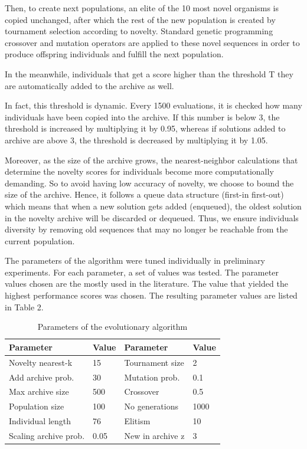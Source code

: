 Then, to create next populations, an elite of the 10 most novel organisms is copied unchanged, after which the rest of the new population is created by tournament selection according to novelty. Standard genetic programming crossover and mutation operators are applied to these novel sequences in order to produce offspring individuals and fulfill the next population.

In the meanwhile, individuals that get a score higher than the threshold T they are automatically added to the archive as well. 

In fact, this threshold is dynamic. Every 1500 evaluations, it is checked how many individuals have been copied into the archive. If this number is below 3, the threshold is increased by multiplying it by 0.95, whereas if solutions added to archive are above 3, the threshold is decreased by multiplying it by 1.05. 

Moreover, as the size of the archive grows, the nearest-neighbor calculations that determine the novelty scores for individuals become more computationally demanding. So to avoid having low accuracy of novelty, we choose to bound the size of the archive. Hence, it follows a queue data structure (first-in first-out) which means that when a new solution gets added (enqueued), the oldest solution in the novelty archive will be discarded or dequeued. Thus, we ensure individuals diversity by removing old sequences that may no longer be reachable from the current population.

The parameters of the algorithm were tuned individually in preliminary experiments. For each parameter, a set of values was tested. The parameter values chosen are the mostly used in the literature. The value that yielded the highest performance scores was chosen. The resulting parameter values are listed in Table 2.
\begin{table}
	\begin{center}
		\caption{Parameters of the evolutionary algorithm}
		\begin{tabular}{ l l || l l }
			Parameter & Value & Parameter & Value \\	\hline
			Novelty nearest-k  & 15 &  Tournament size & 2\\ 
			Add archive prob. & 30 &  Mutation prob. & 0.1\\  
			Max archive size & 500 &  Crossover & 0.5  \\  
			Population size & 100 &  No generations &  1000 \\  
			Individual length & 76 & Elitism & 10  \\ 
			Scaling archive prob. & 0.05 & New in archive z & 3  \\ 
		\end{tabular}
	\end{center}
\end{table}

